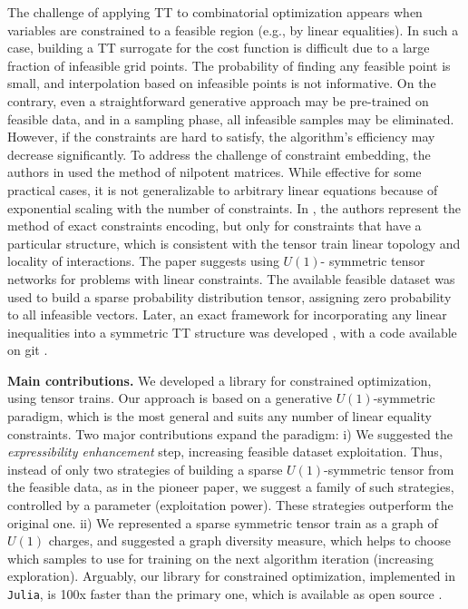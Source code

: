 \documentclass{article}
\theoremstyle{plain}
\theoremstyle{definition}
\theoremstyle{remark}
\begin{document}
The challenge of applying TT to combinatorial optimization appears when variables are constrained to a feasible region (e.g., by linear equalities). In such a case, building a TT surrogate for the cost function is difficult due to a large fraction of infeasible grid points. 
The probability of finding any feasible point is small, and interpolation based on infeasible points is not informative.
On the contrary, even a straightforward generative approach may be pre-trained on feasible data, and in a sampling phase, all infeasible samples may be eliminated. However, if the constraints are hard to satisfy, the algorithm's efficiency may decrease significantly. To address the challenge of constraint embedding, the authors in \cite{nakada2025quick} used the method of nilpotent matrices. While effective for some practical cases, it is not generalizable to arbitrary linear equations because of exponential scaling with the number of constraints. In \cite{Ryzhakov2023Constructive}, the authors represent the method of exact constraints encoding, but only for constraints that have a particular structure, which is consistent with the tensor train linear topology and locality of interactions. The paper \cite{LopezPiqueres2023} suggests using $U(1)$- symmetric tensor networks for problems with linear constraints. The available feasible dataset was used to build a sparse probability distribution tensor, assigning zero probability to all infeasible vectors. Later, an exact framework for incorporating any linear inequalities into a symmetric TT structure was developed \cite{10.21468/SciPostPhys.18.6.192}, with a code available on git \cite{ConstrainTNet2024}. 

\textbf{Main contributions.} We developed a library for constrained optimization, using tensor trains. Our approach is based on a generative $U(1)$-symmetric paradigm, which is the most general and suits any number of linear equality constraints. Two major contributions expand the paradigm: i) We suggested the \textit{expressibility enhancement} step, increasing feasible dataset exploitation. Thus, instead of only two strategies of building a sparse $U(1)$-symmetric tensor from the feasible data, as in the pioneer paper, we suggest a family of such strategies, controlled by a parameter (exploitation power). These strategies outperform the original one. ii) We represented a sparse symmetric tensor train as a graph of $U(1)$ charges, and suggested a graph diversity measure, which helps to choose which samples to use for training on the next algorithm iteration (increasing exploration).
Arguably, our library for constrained optimization, implemented in \texttt{Julia}, is 100x faster than the primary one, which is available as open source \cite{ConstrainTNet2024}.
\end{document}
